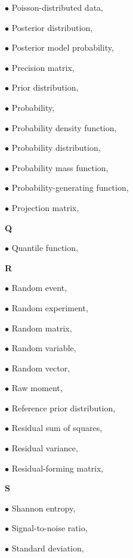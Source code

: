 \documentclass[a4paper,12pt,twoside]{book}
\begin{document}
$\bullet$ Poisson-distributed data, \pageref{sec:poiss-data}

$\bullet$ Posterior distribution, \pageref{sec:post}

$\bullet$ Posterior model probability, \pageref{sec:pmp}

$\bullet$ Precision matrix, \pageref{sec:precmat}

$\bullet$ Prior distribution, \pageref{sec:prior}

$\bullet$ Probability, \pageref{sec:prob}

$\bullet$ Probability density function, \pageref{sec:pdf}

$\bullet$ Probability distribution, \pageref{sec:dist}

$\bullet$ Probability mass function, \pageref{sec:pmf}

$\bullet$ Probability-generating function, \pageref{sec:pgf}

$\bullet$ Projection matrix, \pageref{sec:pmat}


\vspace{1em}
\textbf{Q}

$\bullet$ Quantile function, \pageref{sec:qf}


\vspace{1em}
\textbf{R}

$\bullet$ Random event, \pageref{sec:reve}

$\bullet$ Random experiment, \pageref{sec:rexp}

$\bullet$ Random matrix, \pageref{sec:rmat}

$\bullet$ Random variable, \pageref{sec:rvar}

$\bullet$ Random vector, \pageref{sec:rvec}

$\bullet$ Raw moment, \pageref{sec:mom-raw}

$\bullet$ Reference prior distribution, \pageref{sec:prior-ref}

$\bullet$ Residual sum of squares, \pageref{sec:rss}

$\bullet$ Residual variance, \pageref{sec:resvar}

$\bullet$ Residual-forming matrix, \pageref{sec:rfmat}


\vspace{1em}
\textbf{S}

$\bullet$ Shannon entropy, \pageref{sec:ent}

$\bullet$ Signal-to-noise ratio, \pageref{sec:snr}

$\bullet$ Standard deviation, \pageref{sec:std}
\end{document}
